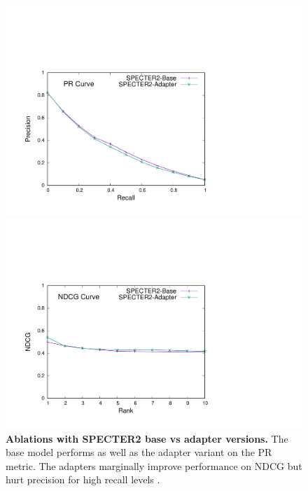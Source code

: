\documentclass[
]{ceurart}
\begin{document}
\begin{figure}
  \centering
  \begin{minipage}{.48\linewidth}
    \centering
    \includegraphics[clip, trim=1.8cm 1.5cm 9cm 6cm, width=\linewidth]{figures/specter.pdf}
  \end{minipage}%
  \hspace{0.4cm}
  \begin{minipage}{.48\linewidth}
    \centering
    \includegraphics[clip, trim=1.8cm 1.5cm 9cm 6cm, width=\linewidth]{figures/specter.ndcg.pdf}
  \end{minipage}
  \caption{\textbf{Ablations with SPECTER2 base vs adapter versions.} The base model performs as well as the adapter variant on the PR metric. The adapters marginally improve performance on NDCG but hurt precision for high recall levels .}
  \label{fig:results_specter}
\end{figure}
\end{document}
